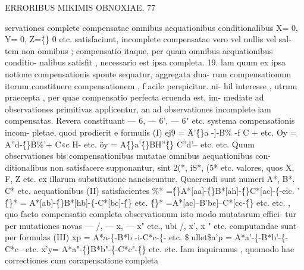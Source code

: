 \documentclass[12pt,a4paper]{article}
\begin{document}
\newpage
\begin{center}
\textsc{ERRORIBUS MIKIMIS OBNOXIAE. 77}
\end{center}
servationes complete compensatae omnibus aequationibus conditionalibus X= 0,
Y= 0, Z=\^\{\} 0 etc. satisfaciunt, incomplete compensatae vero vel nnllis vel sal-
tem non omnibus ; compensatio itaque, per quam omnibus aequationibus conditio-
nalibus satisfit , necessario est ipsa completa.
19.
lam quum ex ipsa notione compensationis sponte sequatur, aggregata dua-
rum compensationum iterum constituere compensationem , f acile perspicitur. ni-
hil interesse , utrum praecepta , per quae compensatio perfecta eruenda est, im-
mediate ad observationes primitivas applicentur, an ad observationes incomplete
iam compensatas.
Revera constituant --- 6, --- 6', --- 6" etc. systema compensationis incom-
pletae, quod prodierit e formulis (I)
ej9 = Ä'\^\{\}a -]-B\% -f C + etc.
Oy = A''d-\^\{\}B\%'+ C«c H- etc.
öy = A\^\{\}a'\^\{\}BH''\^\{\} C''d'-- etc.
etc.
Quum observationes bis compensationibus mutatae omnibus aequationibus con-
ditionalibus non satisfacere supponantur, sint 2(*, iS*, (5* etc. valores, quos
X, F, Z etc. ex illarum substitutione nanciscuntur. Quaerendi sunt numeri
A*, B*. C* etc. aequationibus (II) satisfacientes
\%* =\^\{\}A*[aa]-\^\{\}B*[ah]-\^\{\}C*[ac]-\{-eic. '
\^\{\}* = A*[ab]-\^\{\}B*[hb]-\{-C*[bc]-\^\{\} etc.
\^\{\}* =A*[ac]--B'bc]--C*[cc-\^\{\} etc.
etc. , quo facto compensatio completa observationum isto modo mutatarum effici-
tur per mutationes novas --- /, --- x, --- x" etc., ubi /, x', x " etc. computandae sunt
per formulas (III)
xp = A*a-\{-B*b -i-C*c-\{- etc.
\$ullet\$a'p = A*a'-\{-B*b'-\{- C*c-- etc.
x'y= A*a"-\^\{\}B*b"-\{-C*c"-\^\{\} etc.
etc. Iam inquiramus , quomodo hae correctiones cum corapensatione completa
\end{document}
